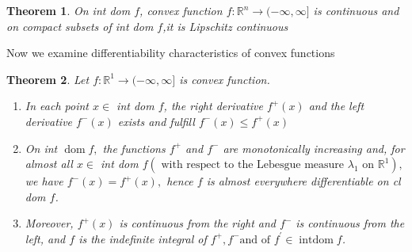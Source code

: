 \documentclass[oneside]{book}
\newtheorem{theorem}{Theorem}[section]
\newtheorem{mydef}{Definition}[section]
\begin{document}
	\begin{theorem}    
		\label{t:7.5}
		On int dom $f$, convex function $f: \mathbb{R}^{n} \rightarrow(-\infty, \infty]$ is continuous and on compact subsets of int dom $f$,it is Lipschitz continuous     
		
	\end{theorem}    
	
	Now we examine differentiability characteristics of convex functions    
	\begin{theorem}    
		\label{t:7.9}
		Let $f: \mathbb{R}^{1} \rightarrow(-\infty, \infty]$ is convex function.    
		\begin{enumerate}    
			\item     
			In each point $x \in$ int dom $f$, the right derivative $ f^{+}(x)$ and the left derivative $f^{-}(x)$ exists and fulfill $f^{-}(x) \leq  f^{+}(x)$    
			\\    
			\item    
			On int $\operatorname{dom} f,$ the functions $f^{+}$ and $f^{-}$ are monotonically increasing and, for almost all    
			$x \in$ int dom $f\left(\text { with respect to the Lebesgue measure } \lambda_{1} \text { on } \mathbb{R}^{1}\right),$ we have $f^{-}(x)=f^{+}(x),$ hence $f$ is almost everywhere differentiable on cl dom $f$.    
			\\    
			\item    
			Moreover, $f^{+}(x)$    
			is continuous from the right and $f^{-}$ is continuous from the left, and $f$ is the indefinite integral of $ f^{+}, f^{-} \text {and of } f^{\prime} \in \operatorname{int dom} f$.
		\end{enumerate}    
		
		
		
		
		
		
	\end{theorem}
	
	
	
	
	
	
	
	

\end{document}
